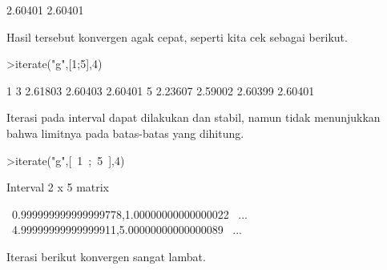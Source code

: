 \documentclass[12pt,Times new roman,letterpaper]{book}
\begin{document}
\begin{eulernootebook}
\begin{eulercomment}
\begin{eulercomment}
\begin{eulernootebook}
\begin{eulercomment}
\begin{eulercomment}
\begin{eulercomment}
\begin{eulercomment}
\begin{eulercomment}
\begin{eulercomment}
\begin{eulernotebook}
\begin{eulercomment}
\begin{eulercomment}
\begin{eulercomment}
\begin{eulercomment}
\begin{eulercomment}
\begin{eulercomment}
\begin{eulercomment}
\begin{eulercomment}
\begin{eulercomment}
\begin{eulercomment}
\begin{eulercomment}
\begin{eulercomment}
\begin{eulercomment}
\begin{eulercomment}
\begin{eulercomment}
\begin{eulercomment}
\begin{eulercomment}
\begin{eulercomment}
\begin{eulercomment}
\begin{eulercomment}
\begin{eulercomment}
\begin{eulercomment}
\begin{eulercomment}
\begin{eulercomment}
\begin{eulercomment}
\begin{eulercomment}
\begin{eulercomment}
\begin{eulercomment}
\begin{eulercomment}
\begin{eulercomment}
\begin{euleroutput}
        2.60401 
        2.60401 
\end{euleroutput}
\begin{eulercomment}
Hasil tersebut konvergen agak cepat, seperti kita cek sebagai berikut.
\end{eulercomment}
\begin{eulerprompt}
>iterate("g",[1;5],4)
\end{eulerprompt}
\begin{euleroutput}
              1             3       2.61803       2.60403       2.60401 
              5       2.23607       2.59002       2.60399       2.60401 
\end{euleroutput}
\begin{eulercomment}
Iterasi pada interval dapat dilakukan dan stabil, namun tidak
menunjukkan bahwa limitnya pada batas-batas yang dihitung.
\end{eulercomment}
\begin{eulerprompt}
>iterate("g",[~1~;~5~],4)
\end{eulerprompt}
\begin{euleroutput}
  Interval 2 x 5 matrix
  
  ~0.999999999999999778,1.00000000000000022~     ...
  ~4.99999999999999911,5.00000000000000089~     ...
\end{euleroutput}
\begin{eulercomment}
Iterasi berikut konvergen sangat lambat.


\end{eulercomment}
\end{eulercomment}
\end{eulercomment}
\end{eulercomment}
\end{eulercomment}
\end{eulercomment}
\end{eulercomment}
\end{eulercomment}
\end{eulercomment}
\end{eulercomment}
\end{eulercomment}
\end{eulercomment}
\end{eulercomment}
\end{eulercomment}
\end{eulercomment}
\end{eulercomment}
\end{eulercomment}
\end{eulercomment}
\end{eulercomment}
\end{eulercomment}
\end{eulercomment}
\end{eulercomment}
\end{eulercomment}
\end{eulercomment}
\end{eulercomment}
\end{eulercomment}
\end{eulercomment}
\end{eulercomment}
\end{eulercomment}
\end{eulercomment}
\end{eulercomment}
\end{eulernotebook}
\end{eulercomment}
\end{eulercomment}
\end{eulercomment}
\end{eulercomment}
\end{eulercomment}
\end{eulercomment}
\end{eulernootebook}
\end{eulercomment}
\end{eulercomment}
\end{eulernootebook}
\end{document}
